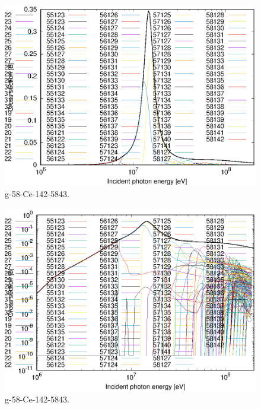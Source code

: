 \begin{figure}
 \includegraphics[width=\linewidth]{eps/g_58-Ce-142_5843.eps}
  \caption{g-58-Ce-142-5843.}
\end{figure}
\begin{figure}
 \includegraphics[width=\linewidth]{eps-log/g_58-Ce-142_5843.eps}
 \caption{g-58-Ce-142-5843.}
\end{figure}
\newpage \clearpage

